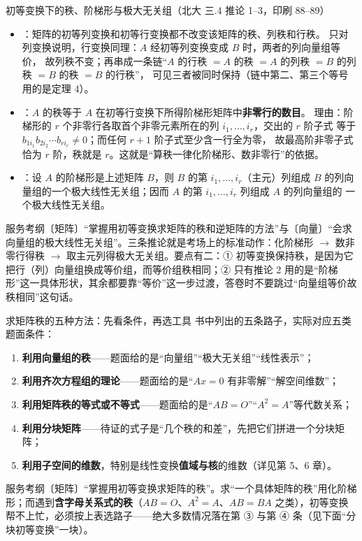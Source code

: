 \begin{fdeep}{初等变换下的秩、阶梯形与极大无关组（北大 三.4 推论 1--3，印刷 88--89）}
\begin{itemize}[leftmargin=2.2em,itemsep=0.25em]
\item {}：矩阵的初等列变换和初等行变换都不改变该矩阵的秩、列秩和行秩。
      只对列变换说明，行变换同理：$A$ 经初等列变换变成 $B$ 时，两者的列向量组等价，
      故列秩不变；再串成一条链“$A$ 的行秩 $=A$ 的秩 $=A$ 的列秩 $=B$ 的列秩 $=B$ 的秩 $=B$ 的行秩”，
      可见三者被同时保持（链中第二、第三个等号用的是定理 4）。
\item {}：$A$ 的秩等于 $A$ 在初等行变换下所得阶梯形矩阵中\textbf{非零行的数目}。
      理由：阶梯形的 $r$ 个非零行各取首个非零元素所在的列 $i_1,\dots,i_r$，交出的 $r$ 阶子式
      等于 $b_{1i_1}b_{2i_2}\cdots b_{ri_r}\ne0$；而任何 $r+1$ 阶子式至少含一行全为零，
      故最高阶非零子式恰为 $r$ 阶，秩就是 $r$。这就是“算秩一律化阶梯形、数非零行”的依据。
\item {}：设 $A$ 的阶梯形是上述矩阵 $B$，则 $B$ 的第 $i_1,\dots,i_r$（主元）列组成
      $B$ 的列向量组的一个极大线性无关组；因而 $A$ 的第 $i_1,\dots,i_r$ 列组成 $A$ 的列向量组的
      一个极大线性无关组。
\end{itemize}
\fbref{}服务考纲〔矩阵〕“掌握用初等变换求矩阵的秩和逆矩阵的方法”与〔向量〕“会求向量组的极大线性无关组”。三条推论就是考场上的标准动作：化阶梯形 $\to$ 数非零行得秩 $\to$ 取主元列得极大无关组。要点有二：① 初等变换保持秩，是因为它把行（列）向量组换成等价组，而等价组秩相同；② 只有推论 2 用的是“阶梯形”这一具体形状，其余都要靠“等价”这一步过渡，答卷时不要跳过“向量组等价故秩相同”这句话。
\end{fdeep}


\begin{fdeep}{求矩阵秩的五种方法：先看条件，再选工具}
书中列出的五条路子，实际对应五类题面条件：
\begin{enumerate}[leftmargin=2.4em,itemsep=0.22em]
\item \textbf{利用向量组的秩}——题面给的是“向量组”“极大无关组”“线性表示”；
\item \textbf{利用齐次方程组的理论}——题面给的是“$Ax=0$ 有非零解”“解空间维数”；
\item \textbf{利用矩阵秩的等式或不等式}——题面给的是“$AB=O$”“$A^{2}=A$”等代数关系；
\item \textbf{利用分块矩阵}——待证的式子是“几个秩的和差”，先把它们拼进一个分块矩阵；
\item \textbf{利用子空间的维数}，特别是线性变换\textbf{值域与核}的维数（详见第 5、6 章）。
\end{enumerate}
\fbref{}服务考纲〔矩阵〕“掌握用初等变换求矩阵的秩”。求“一个具体矩阵的秩”用化阶梯形；而遇到\textbf{含字母关系式的秩}（$AB=O$、$A^{2}=A$、$AB=BA$ 之类），初等变换帮不上忙，必须按上表选路子——绝大多数情况落在第 ③ 与第 ④ 条（见下面“分块初等变换”一块）。
\end{fdeep}

